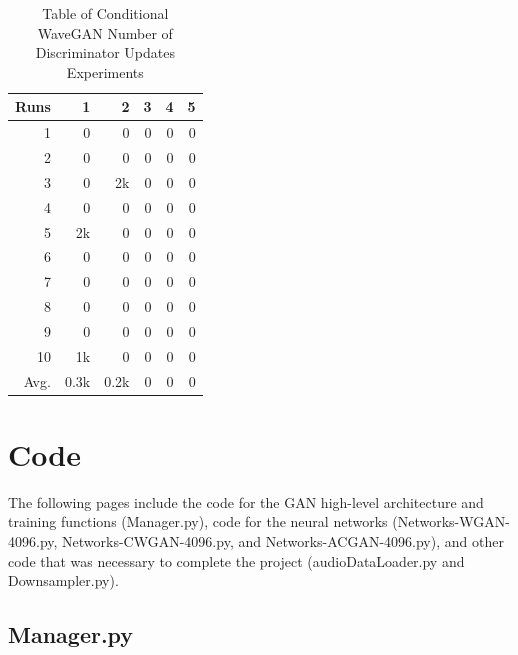 \documentclass[a4paper, titlepage]{article}
\begin{document}
\begin{appendices}
\begin{table}[ht]
\begin{center}
\begin{tabular}{ r | r | r | r | r | r }
      \end{tabular}
    \end{center}
    
  \end{table}

  \begin{table}[ht]

  \caption{Table of Conditional WaveGAN Number of Discriminator Updates Experiments}
    \label{tab:CWGAN_Ds}
    
    \begin{center}
      \begin{tabular}{ r | r | r | r | r | r }
        
        Runs & 1 & 2 & 3 & 4 & 5 \\
        \hline
        1 & 0 & 0 & 0 & 0 & 0 \\
        2 & 0 & 0 & 0 & 0 & 0 \\
        3 & 0 & 2k & 0 & 0 & 0 \\
        4 & 0 & 0 & 0 & 0 & 0 \\
        5 & 2k & 0 & 0 & 0 & 0 \\
        6 & 0 & 0 & 0 & 0 & 0 \\
        7 & 0 & 0 & 0 & 0 & 0 \\
        8 & 0 & 0 & 0 & 0 & 0 \\
        9 & 0 & 0 & 0 & 0 & 0 \\
        10 & 1k & 0 & 0 & 0 & 0 \\
        \hline
        Avg. & 0.3k & 0.2k & 0 & 0 & 0 \\
        
      \end{tabular}
    \end{center}
    
  \end{table}

  \clearpage

  \section{Code}

  The following pages include the code for the GAN high-level architecture and training functions (Manager.py), code for the neural networks (Networks-WGAN-4096.py, Networks-CWGAN-4096.py, and Networks-ACGAN-4096.py), and other code that was necessary to complete the project (audioDataLoader.py and Downsampler.py). 

  \subsection{Manager.py}


\end{appendices}
\end{document}

